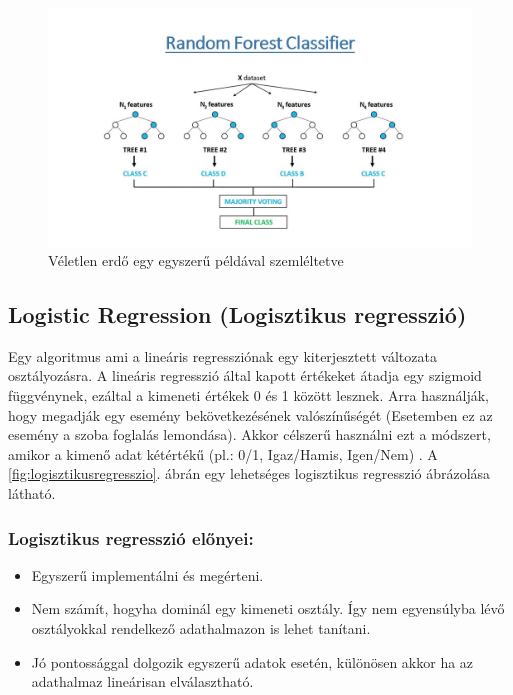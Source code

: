 \begin{figure}[h]
    \centering
    \includegraphics[width=\linewidth]{images/3.fejezet/RandomForest.jpg}
    \caption{Véletlen erdő egy egyszerű példával szemléltetve \cite{veletlenerdo_abra}}
    \label{fig:veletlenerdo}
\end{figure}



\subsection{Logistic Regression (Logisztikus regresszió)}
Egy algoritmus ami a lineáris regressziónak egy kiterjesztett változata osztályozásra. A lineáris regresszió által kapott értékeket átadja egy szigmoid függvénynek, ezáltal a kimeneti értékek 0 és 1 között lesznek.   Arra használják, hogy megadják egy esemény bekövetkezésének valószínűségét (Esetemben ez az esemény a szoba foglalás lemondása). Akkor célszerű használni ezt a módszert, amikor a kimenő adat kétértékű (pl.: 0/1, Igaz/Hamis, Igen/Nem) \cite{logisztikus_regresszio_2}. A \ref{fig:logisztikusregresszio}. ábrán egy lehetséges logisztikus regresszió ábrázolása látható.

\subsubsection{Logisztikus regresszió előnyei:}
\begin{itemize}
    \item Egyszerű implementálni és megérteni.
    \item Nem számít, hogyha dominál egy kimeneti osztály. Így nem egyensúlyba lévő osztályokkal rendelkező adathalmazon is lehet tanítani.
    \item Jó pontossággal dolgozik egyszerű adatok esetén, különösen akkor ha az adathalmaz lineárisan elválasztható.
\end{itemize}

